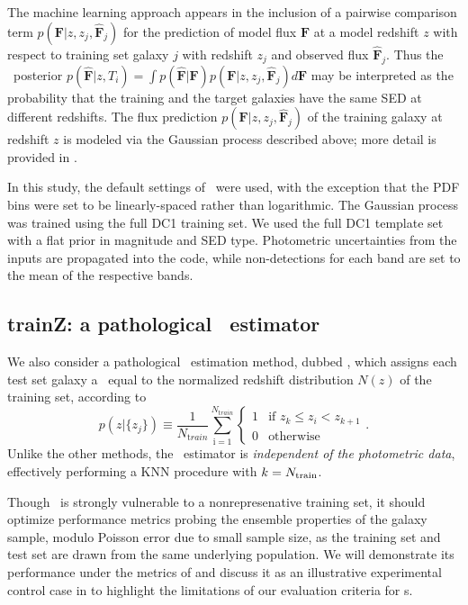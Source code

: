 The machine learning approach appears in the inclusion of a pairwise comparison term $p(\mathbf{F} \vert z, z_j, \mathbf{\hat{F}}_j)$ for the prediction of model flux $\mathbf{F}$ at a model redshift $z$ with respect to training set galaxy $j$ with redshift $z_j$ and observed flux $\mathbf{\hat{F}}_j$.
Thus the \pz\ posterior $p(\mathbf{\hat{F}} \vert z, T_i) = \int p(\mathbf{\hat{F}} \vert \mathbf{F}) p(\mathbf{F} \vert z, z_j, \mathbf{\hat{F}}_j) d\mathbf{F}$ may be interpreted as the probability that the training and the target galaxies have the same SED at different redshifts.
The flux prediction $p(\mathbf{F} \vert z, z_j, \mathbf{\hat{F}}_j)$ of the training galaxy at redshift $z$ is modeled via the Gaussian process described above; more detail is provided in \citet{Leistedt:17}.

In this study, the default settings of \delight\ were used, with the exception that the PDF bins were set to be linearly-spaced rather than logarithmic.
The Gaussian process was trained using the full DC1 training set.
We used the full DC1 template set with a flat prior in magnitude and SED type.
Photometric uncertainties from the inputs are propagated into the code, while non-detections for each band are set to the mean of the respective bands.

\subsection{trainZ: a pathological \pz\ estimator}

We also consider a pathological \pzpdf\ estimation method, dubbed \trainz, which assigns each test set galaxy a \pzpdf\ equal to the normalized redshift distribution $N(z)$ of the training set, according to
\begin{equation}
p(z \vert \{z_{j}\}) \equiv \frac{1}{N_{ \mathrm train}}\sum_{\mathrm i=1}^{N_{\mathrm train}} \begin{cases} 1 & \text{if\ } z_{k}\leq z_{i} < z_{k+1}\\ 0 & \text{otherwise} \end{cases}.
\end{equation}
Unlike the other methods, the \trainz\ estimator is \textit{independent of the photometric data}, effectively performing a KNN procedure with $k=N_{\rm train}$.

Though \trainz\ is strongly vulnerable to a nonrepresenative training set, it should optimize performance metrics probing the ensemble properties of the galaxy sample, modulo Poisson error due to small sample size, as the training set and test set are drawn from the same underlying population.
We will demonstrate its performance under the metrics of  and discuss it as an illustrative experimental control case in  to highlight the limitations of our evaluation criteria for \pzpdf s.

